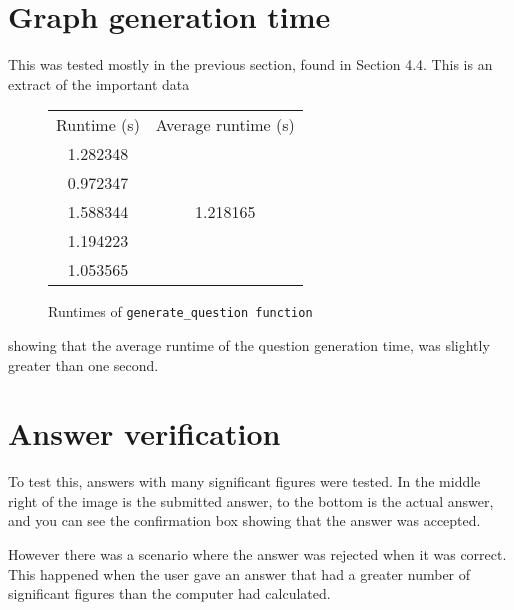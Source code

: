 \section{Graph generation time}
This was tested mostly in the previous section, found in Section 4.4. This is an extract of the important data
\begin{figure}[H]
	\centering
	\begin{tabular}{|c|c|}
		\hline
		Runtime (s) & Average runtime (s)       \\
		
		1.282348    &  \multirow{5}{*}{1.218165}\\
		
		0.972347    &                           \\
		
		1.588344    &                           \\
		
		1.194223    &                           \\
		
		1.053565    &\\
		\hline       
	\end{tabular}
	\caption{Runtimes of \texttt{generate\_question function}}
\end{figure}
showing that the average runtime of the question generation time, was slightly greater than one second.
\section{Answer verification}
To test this, answers with many significant figures were tested.
In the middle right of the image is the submitted answer, to the bottom is the actual answer, and you can see the confirmation box showing that the answer was accepted. 

However there was a scenario where the answer was rejected when it was correct. This happened when the user gave an answer that had a greater number of significant figures than the computer had calculated.